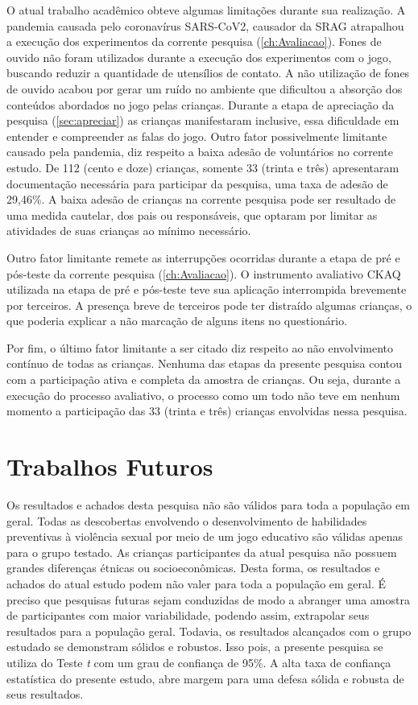 O atual trabalho acadêmico obteve algumas limitações durante sua realização. A pandemia causada pelo coronavírus SARS-CoV2, causador da \ac{SRAG} atrapalhou a execução dos experimentos da corrente pesquisa (\autoref{ch:Avaliacao}). Fones de ouvido não foram utilizados durante a execução dos experimentos com o jogo, buscando reduzir a quantidade de utensílios de contato. A não utilização de fones de ouvido acabou por gerar um ruído no ambiente que dificultou a absorção dos conteúdos abordados no jogo pelas crianças. Durante a etapa de apreciação da pesquisa (\autoref{sec:apreciar}) as crianças manifestaram inclusive, essa dificuldade em entender e compreender as falas do jogo. Outro fator possivelmente limitante causado pela pandemia, diz respeito a baixa adesão de voluntários no corrente estudo. De 112 (cento e doze) crianças, somente 33 (trinta e três) apresentaram documentação necessária para participar da pesquisa, uma taxa de adesão de 29,46\%. A baixa adesão de crianças na corrente pesquisa pode ser resultado de uma medida cautelar, dos pais ou responsáveis, que optaram por limitar as atividades de suas crianças ao mínimo necessário. 

Outro fator limitante remete as interrupções ocorridas durante a etapa de pré e pós-teste da corrente pesquisa (\autoref{ch:Avaliacao}). O instrumento avaliativo \ac{CKAQ} utilizada na etapa de pré e pós-teste teve sua aplicação interrompida brevemente por terceiros. A presença breve de terceiros pode ter distraído algumas crianças, o que poderia explicar a não marcação de alguns itens no questionário. %

Por fim, o último fator limitante a ser citado diz respeito ao não envolvimento contínuo de todas as crianças. Nenhuma das etapas da presente pesquisa contou com a participação ativa e completa da amostra de crianças. Ou seja, durante a execução do processo avaliativo, o processo como um todo não teve em nenhum momento a participação das 33 (trinta e três) crianças envolvidas nessa pesquisa. 

\section{Trabalhos Futuros}\label{sec:futuros}

Os resultados e achados desta pesquisa não são válidos para toda a população em geral. Todas as descobertas envolvendo o desenvolvimento de habilidades preventivas à violência sexual por meio de um jogo educativo são válidas apenas para o grupo testado. As crianças participantes da atual pesquisa não possuem grandes diferenças étnicas ou socioeconômicas. Desta forma, os resultados e achados do atual estudo podem não valer para toda a população em geral. É preciso que pesquisas futuras sejam conduzidas de modo a abranger uma amostra de participantes com maior variabilidade, podendo assim, extrapolar seus resultados para a população geral. Todavia, os resultados alcançados com o grupo estudado se demonstram sólidos e robustos. Isso pois, a presente pesquisa se utiliza do Teste \textit{t} com um grau de confiança de 95\%. A alta taxa de confiança estatística do presente estudo, abre margem para uma defesa sólida e robusta de seus resultados.


